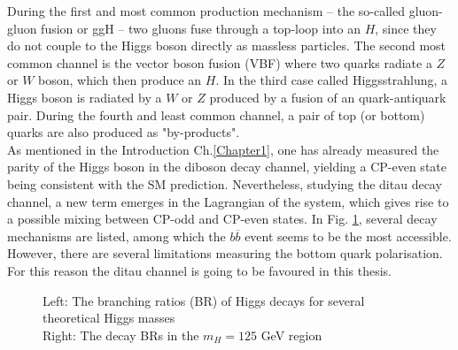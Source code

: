 During the first and most common production mechanism -- the so-called gluon-gluon fusion or ggH -- two gluons fuse through a top-loop into an $H$, since they do not couple to the Higgs boson directly as massless particles. The second most common channel is the vector boson fusion (VBF) where two quarks radiate a $Z$ or $W$ boson, which then produce an $H$. In the third case called Higgsstrahlung, a Higgs boson is radiated by a $W$ or $Z$ produced by a fusion of an quark-antiquark pair. During the fourth and least common channel, a pair of top (or bottom) quarks are also produced as "by-products". \\
As mentioned in the Introduction Ch.\ref{Chapter1}, one has already measured the parity of the Higgs boson in the diboson decay channel, yielding a CP-even state being consistent with the SM prediction. Nevertheless, studying the ditau decay channel, a new term emerges in the Lagrangian of the system, which gives rise to a possible mixing between CP-odd and CP-even states. In Fig. \ref{fig:Higgs_decays}, several decay mechanisms are listed, among which the $b\overline{b}$ event seems to be the most accessible. However, there are several limitations measuring the bottom quark polarisation. For this reason the ditau channel is going to be favoured in this thesis.
\begin{figure}[h]
	\centering
		
	\caption{Left: The branching ratios (BR) of Higgs decays for several theoretical Higgs masses\\Right: The decay BRs in the $m_H = 125$ GeV region}
	\label{fig:Higgs_decays}
\end{figure}
